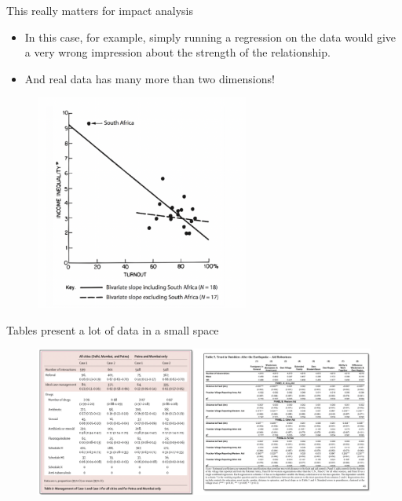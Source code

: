 \documentclass[aspectratio=169]{beamer}
\begin{document}
\begin{frame}{This really matters for impact analysis}
	\begin{multicols}{2}	
		
		\begin{itemize}[<default overlay specification>]
			\item<1> In this case, for example, simply running a regression on the data would give a very wrong impression about the strength of the relationship.
			\item<1> And real data has many more than two dimensions!
		\end{itemize}
		
		\begin{figure}
			\centering
			\includegraphics[width=70mm]{img/Impact}
		\end{figure}
		
	\end{multicols}
\end{frame}


\begin{frame}{Tables present a lot of data in a small space}
	
	\begin{figure}
		\centering
		\includegraphics[width=\linewidth]{img/Table}
	\end{figure}
	
\end{frame}
\end{document}
